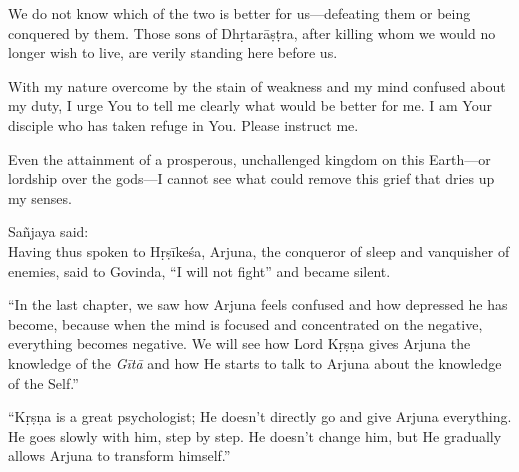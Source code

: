 {We do not know which of the two is better for us---defeating them or being conquered by them. Those sons of Dhṛtarāṣṭra, after killing whom we would no longer wish to live, are verily standing here before us.}

{With my nature overcome by the stain of weakness and my mind confused about my duty, I urge You to tell me clearly what would be better for me. I am Your disciple who has taken refuge in You. Please instruct me.}

{Even the attainment of a prosperous, unchallenged kingdom on this Earth---or lordship over the gods---I cannot see what could remove this grief that dries up my senses.}

{\hspace*{1em}Sañjaya said: \\
Having thus spoken to Hṛṣīkeśa, Arjuna, the conqueror of sleep and vanquisher of enemies, said to Govinda, \enquote{I will not fight} and became silent.}

\enquote{In the last chapter, we saw how Arjuna feels confused and how depressed he has become, because when the mind is focused and concentrated on the negative, everything becomes negative. We will see how Lord Kṛṣṇa gives Arjuna the knowledge of the \textit{Gītā} and how He starts to talk to Arjuna about the knowledge of the Self.}

\enquote{Kṛṣṇa is a great psychologist; He doesn’t directly go and give Arjuna everything. He goes slowly with him, step by step. He doesn’t change him, but He gradually allows Arjuna to transform himself.}

